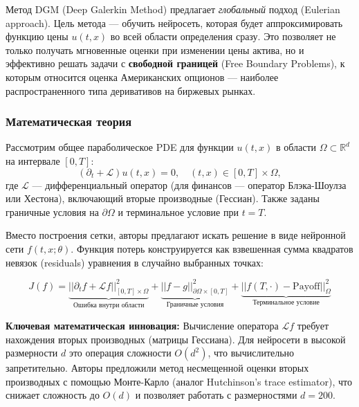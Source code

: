 Метод DGM (Deep Galerkin Method) предлагает \textit{глобальный} подход (Eulerian approach). Цель метода — обучить нейросеть, которая будет аппроксимировать функцию цены $u(t, x)$ во всей области определения сразу. Это позволяет не только получать мгновенные оценки при изменении цены актива, но и эффективно решать задачи с \textbf{свободной границей} (Free Boundary Problems), к которым относится оценка Американских опционов — наиболее распространенного типа деривативов на биржевых рынках.

\subsubsection{Математическая теория}
Рассмотрим общее параболическое PDE для функции $u(t, x)$ в области $\Omega \subset \mathbb{R}^d$ на интервале $[0, T]$:
\begin{equation}
    (\partial_t + \mathcal{L})u(t, x) = 0, \quad (t, x) \in [0, T] \times \Omega,
\end{equation}
где $\mathcal{L}$ — дифференциальный оператор (для финансов — оператор Блэка-Шоулза или Хестона), включающий вторые производные (Гессиан). Также заданы граничные условия на $\partial \Omega$ и терминальное условие при $t=T$.

Вместо построения сетки, авторы предлагают искать решение в виде нейронной сети $f(t, x; \theta)$. Функция потерь конструируется как взвешенная сумма квадратов невязок (residuals) уравнения в случайно выбранных точках:

\begin{equation}
    J(f) = \underbrace{|| \partial_t f + \mathcal{L}f ||^2_{[0,T]\times \Omega}}_{\text{Ошибка внутри области}} + \underbrace{||f - g||^2_{\partial \Omega \times [0, T]}}_{\text{Граничные условия}} + \underbrace{||f(T, \cdot) - \text{Payoff}||^2_{\Omega}}_{\text{Терминальное условие}}
\end{equation}

\textbf{Ключевая математическая инновация:}
Вычисление оператора $\mathcal{L}f$ требует нахождения вторых производных (матрицы Гессиана). Для нейросети в высокой размерности $d$ это операция сложности $O(d^2)$, что вычислительно запретительно. Авторы предложили метод несмещенной оценки вторых производных с помощью Монте-Карло (аналог Hutchinson's trace estimator), что снижает сложность до $O(d)$ и позволяет работать с размерностями $d=200$.

